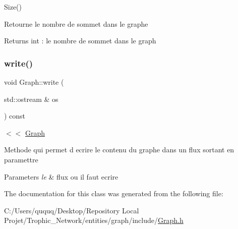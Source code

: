 Size() 

Retourne le nombre de sommet dans le graphe

\begin{DoxyReturn}{Returns}
int \+: le nombre de sommet dans le graph 
\end{DoxyReturn}
\mbox{\label{class_graph_aada8884f6aea111f9b36d8dfb3e5c0a9}} 
\subsubsection{\texorpdfstring{write()}{write()}}
{\footnotesize\ttfamily void Graph\+::write (\begin{DoxyParamCaption}\item[{std\+::ostream \&}]{os }\end{DoxyParamCaption}) const}



$<$$<$ \mbox{\hyperlink{class_graph}{Graph}} 

Methode qui permet d ecrire le contenu du graphe dans un flux sortant en paramettre


\begin{DoxyParams}{Parameters}
{\em le} & flux ou il faut ecrire \\
\hline
\end{DoxyParams}


The documentation for this class was generated from the following file\+:\begin{DoxyCompactItemize}
\item 
C\+:/\+Users/ququq/\+Desktop/\+Repository Local Projet/\+Trophic\+\_\+\+Network/entities/graph/include/\mbox{\hyperlink{_graph_8h}{Graph.\+h}}\end{DoxyCompactItemize}
